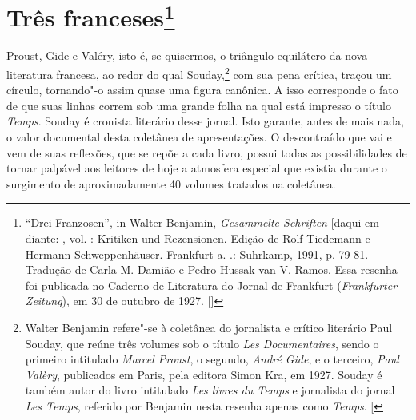 \chapter{Três franceses\footnote[*]{``Drei Franzosen'',
  in Walter Benjamin, \emph{Gesammelte Schriften} {[}daqui em diante:
  \versal{GS}{]}, vol. : Kritiken und Rezensionen. Edição de Rolf Tiedemann e
  Hermann Schweppenhäuser. Frankfurt a. .: Suhrkamp, 1991, p. 79-81.
  Tradução de Carla M. Damião e Pedro Hussak van V. Ramos. Essa resenha
  foi publicada no Caderno de Literatura do Jornal de Frankfurt
  (\emph{Frankfurter Zeitung}), em 30 de outubro de 1927.
  []}}

Proust, Gide e Valéry, isto é, se quisermos, o triângulo equilátero da
nova literatura francesa, ao redor do qual Souday,\footnote{Walter
  Benjamin refere"-se à coletânea do jornalista e crítico literário Paul
  Souday, que reúne três volumes sob o título \emph{Les Documentaires},
  sendo o primeiro intitulado \emph{Marcel Proust}, o segundo,
  \emph{André Gide}, e o terceiro, \emph{Paul Valèry}, publicados em
  Paris, pela editora Simon Kra, em 1927. Souday é também autor do livro
  intitulado \emph{Les livres du Temps} e jornalista do jornal \emph{Les
  Temps}, referido por Benjamin nesta resenha apenas como \emph{Temps}.
  {[}\versal{N. E.}{]}} com sua pena crítica, traçou um círculo, tornando"-o assim
quase uma figura canônica. A isso corresponde o fato de que suas linhas
correm sob uma grande folha na qual está impresso o título \emph{Temps}.
Souday é cronista literário desse jornal. Isto garante, antes de mais
nada, o valor documental desta coletânea de apresentações. O
descontraído que vai e vem de suas reflexões, que se repõe a cada livro,
possui todas as possibilidades de tornar palpável aos leitores de hoje a
atmosfera especial que existia durante o surgimento de aproximadamente
40 volumes tratados na coletânea.

